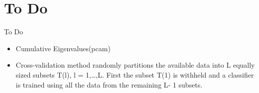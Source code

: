 \documentclass{beamer}
\begin{document}
\section{To Do}
\begin{frame}{To Do}
    \begin{itemize}
        \item Cumulative Eigenvalues(pcam)
        \item Cross-validation method randomly partitions the available data into L equally sized subsets T(l), l = 1,…,L. First the subset T(1) is withheld and a classifier is trained using all the data from the remaining L- 1 subsets.
    \end{itemize}
\end{frame}
\end{document}
